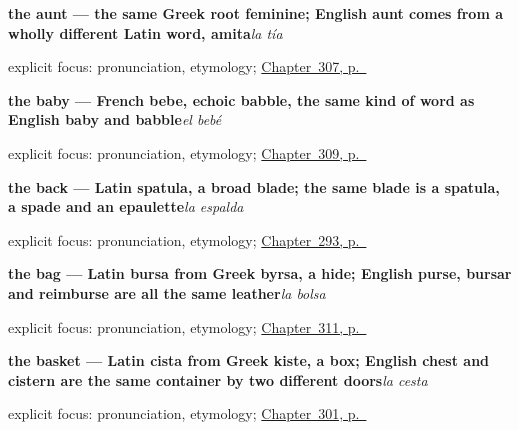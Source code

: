 \noindent\begin{minipage}[t]{\linewidth}
\raggedright
\textbf{the aunt --- the same Greek root feminine; English aunt comes from a wholly different Latin word, amita}\enspace\emph{la tía}\par
\footnotesize explicit focus: pronunciation, etymology; \hyperref[ch:esposos-y-tios]{Chapter~307, p.~\pageref*{ch:esposos-y-tios}}
\end{minipage}\par\smallskip

\noindent\begin{minipage}[t]{\linewidth}
\raggedright
\textbf{the baby --- French bebe, echoic babble, the same kind of word as English baby and babble}\enspace\emph{el bebé}\par
\footnotesize explicit focus: pronunciation, etymology; \hyperref[ch:familia-y-pareja]{Chapter~309, p.~\pageref*{ch:familia-y-pareja}}
\end{minipage}\par\smallskip

\noindent\begin{minipage}[t]{\linewidth}
\raggedright
\textbf{the back — Latin spatula, a broad blade; the same blade is a spatula, a spade and an epaulette}\enspace\emph{la espalda}\par
\footnotesize explicit focus: pronunciation, etymology; \hyperref[ch:mas-del-cuerpo]{Chapter~293, p.~\pageref*{ch:mas-del-cuerpo}}
\end{minipage}\par\smallskip

\noindent\begin{minipage}[t]{\linewidth}
\raggedright
\textbf{the bag — Latin bursa from Greek byrsa, a hide; English purse, bursar and reimburse are all the same leather}\enspace\emph{la bolsa}\par
\footnotesize explicit focus: pronunciation, etymology; \hyperref[ch:la-tienda-y-la-cuenta]{Chapter~311, p.~\pageref*{ch:la-tienda-y-la-cuenta}}
\end{minipage}\par\smallskip

\noindent\begin{minipage}[t]{\linewidth}
\raggedright
\textbf{the basket — Latin cista from Greek kiste, a box; English chest and cistern are the same container by two different doors}\enspace\emph{la cesta}\par
\footnotesize explicit focus: pronunciation, etymology; \hyperref[ch:mas-cosas-que-pedir]{Chapter~301, p.~\pageref*{ch:mas-cosas-que-pedir}}
\end{minipage}\par\smallskip

